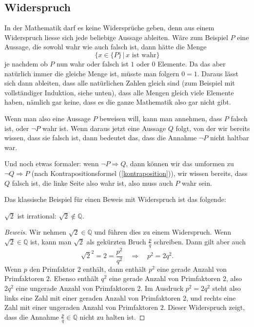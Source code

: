 \subsection{Widerspruch\label{widerspruchsbeweis}}
%
%
In der Mathematik darf es keine Widersprüche geben, denn aus einem
Widerspruch liesse sich jede beliebige Aussage ableiten. Wäre zum
Beispiel $P$ eine Aussage, die sowohl wahr wie auch falsch ist,
dann hätte die Menge
\[
\{x\in\{P\}\,|\, \text{$x$ ist wahr}\}
\]
je nachdem ob $P$ nun wahr oder falsch ist $1$ oder $0$ Elemente.
Da das aber natürlich immer die gleiche Menge ist, müsste man
folgern $0=1$. Daraus lässt sich dann ableiten, dass alle natürlichen
Zahlen gleich sind (zum Beispiel mit vollständiger Induktion, siehe
unten), dass alle Mengen gleich viele Elemente haben, nämlich gar
keine, dass es die ganze Mathematik also gar nicht gibt.

Wenn man also eine Aussage $P$ beweisen will, kann man annehmen,
dass $P$ falsch ist, oder $\neg P$ wahr ist. Wenn daraus jetzt
eine Aussage $Q$ folgt, von der wir bereits wissen, dass sie falsch
ist, dann bedeutet das, dass die Annahme $\neg P$ nicht haltbar
war.

Und noch etwas formaler: wenn $\neg P\Rightarrow Q$, dann können
wir das umformen zu $\neg Q\Rightarrow P$ (nach Kontrapositionsformel
(\ref{kontraposition})), wir wissen bereits, dass
$Q$ falsch ist, die linke Seite also wahr ist, also muss auch $P$
wahr sein.

Das klassische Beispiel für einen Beweis mit Widerspruch ist das 
folgende:
\begin{satz}$\sqrt{2}$ ist irrational: $\sqrt{2}\not\in\mathbb Q$.
%
\end{satz}
\begin{proof}[Beweis]
Wir nehmen $\sqrt{2}\in\mathbb Q$ und führen dies zu einem
Widerspruch. Wenn $\sqrt{2}\in\mathbb Q$ ist, kann man $\sqrt{2}$
als gekürzten Bruch $\frac{p}{q}$ schreiben. Dann gilt aber
auch
\[
\sqrt{2}^2=2=\frac{p^2}{q^2}\quad\Rightarrow\quad p^2=2q^2.
\]
Wenn $p$ den Primfaktor $2$ enthält, dann enthält $p^2$
eine gerade Anzahl von Primfaktoren $2$. Ebenso enthält
$q^2$ eine gerade Anzahl von Primfaktoren $2$, also $2q^2$
eine ungerade Anzahl von Primfaktoren $2$.
Im Ausdruck $p^2=2q^2$ steht also links eine Zahl mit einer
geraden Anzahl von Primfaktoren $2$, und rechts eine Zahl mit
einer ungeraden Anzahl von Primfaktoren $2$.
Dieser Widerspruch zeigt, dass die
Annahme $\frac{p}q\in\mathbb Q$ nicht zu halten ist.
\end{proof}

